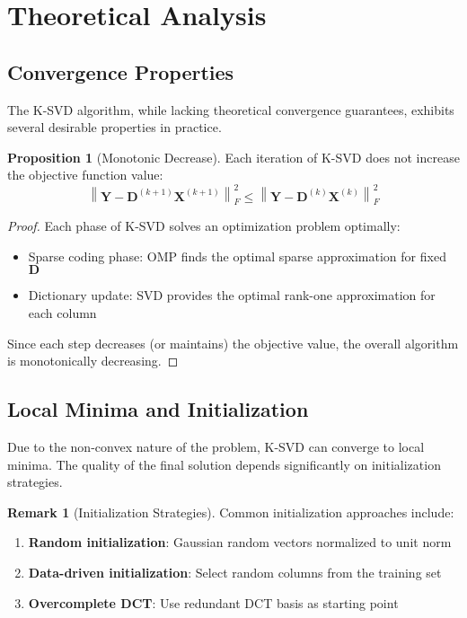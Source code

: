 \documentclass[12pt]{article}
\newcommand{\norm}[1]{\left\|#1\right\|}
\theoremstyle{definition}
\newtheorem{proposition}{Proposition}[section]
\newtheorem{remark}{Remark}[section]
\begin{document}
\newpage

\section{Theoretical Analysis}

\subsection{Convergence Properties}

The K-SVD algorithm, while lacking theoretical convergence guarantees, exhibits several desirable properties in practice.

\begin{proposition}[Monotonic Decrease]\label{prop:monotonic}
    Each iteration of K-SVD does not increase the objective function value:
    \begin{equation}
        \norm{\mathbf{Y} - \mathbf{D}^{(k+1)}\mathbf{X}^{(k+1)}}_F^2 \leq \norm{\mathbf{Y} - \mathbf{D}^{(k)}\mathbf{X}^{(k)}}_F^2
    \end{equation}
\end{proposition}

\begin{proof}
    Each phase of K-SVD solves an optimization problem optimally:
    \begin{itemize}
        \item Sparse coding phase: OMP finds the optimal sparse approximation for fixed $\mathbf{D}$
        \item Dictionary update: SVD provides the optimal rank-one approximation for each column
    \end{itemize}
    Since each step decreases (or maintains) the objective value, the overall algorithm is monotonically decreasing.
\end{proof}

\subsection{Local Minima and Initialization}

Due to the non-convex nature of the problem, K-SVD can converge to local minima. The quality of the final solution depends significantly on initialization strategies.

\begin{remark}[Initialization Strategies]
    Common initialization approaches include:
    \begin{enumerate}
        \item \textbf{Random initialization}: Gaussian random vectors normalized to unit norm
        \item \textbf{Data-driven initialization}: Select random columns from the training set
        \item \textbf{Overcomplete DCT}: Use redundant DCT basis as starting point
    \end{enumerate}
\end{remark}
\end{document}

